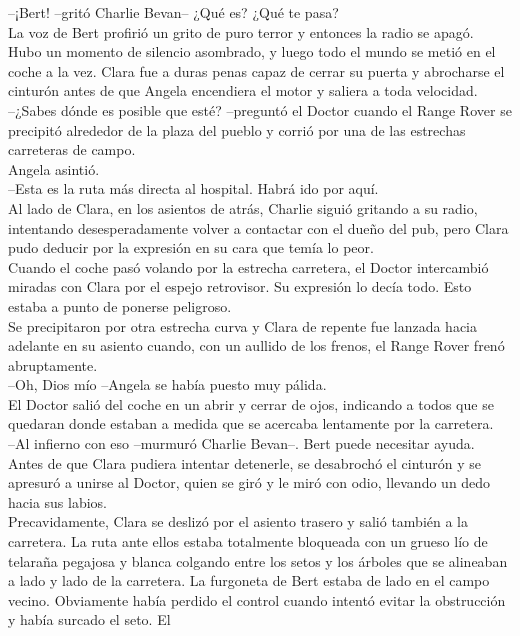 --¡Bert! --gritó Charlie Bevan-- ¿Qué es? ¿Qué te pasa?\\
La voz de Bert profirió un grito de puro terror y entonces la radio se
apagó.\\
Hubo un momento de silencio asombrado, y luego todo el mundo se metió en
el coche a la vez. Clara fue a duras penas capaz de cerrar su puerta y
abrocharse el cinturón antes de que Angela encendiera el motor y saliera
a toda velocidad.\\
--¿Sabes dónde es posible que esté? --preguntó el Doctor cuando el Range
Rover se precipitó alrededor de la plaza del pueblo y corrió por una de
las estrechas carreteras de campo.\\
Angela asintió.\\
--Esta es la ruta más directa al hospital. Habrá ido por aquí.\\
Al lado de Clara, en los asientos de atrás, Charlie siguió gritando a su
radio, intentando desesperadamente volver a contactar con el dueño del
pub, pero Clara pudo deducir por la expresión en su cara que temía lo
peor.\\
Cuando el coche pasó volando por la estrecha carretera, el Doctor
intercambió miradas con Clara por el espejo retrovisor. Su expresión lo
decía todo. Esto estaba a punto de ponerse peligroso.\\
Se precipitaron por otra estrecha curva y Clara de repente fue lanzada
hacia adelante en su asiento cuando, con un aullido de los frenos, el
Range Rover frenó abruptamente.\\
--Oh, Dios mío --Angela se había puesto muy pálida.\\
El Doctor salió del coche en un abrir y cerrar de ojos, indicando a
todos que se quedaran donde estaban a medida que se acercaba lentamente
por la carretera.\\
--Al infierno con eso --murmuró Charlie Bevan--. Bert puede necesitar
ayuda.\\
Antes de que Clara pudiera intentar detenerle, se desabrochó el cinturón
y se apresuró a unirse al Doctor, quien se giró y le miró con odio,
llevando un dedo hacia sus labios.\\
Precavidamente, Clara se deslizó por el asiento trasero y salió también
a la carretera. La ruta ante ellos estaba totalmente bloqueada con un
grueso lío de telaraña pegajosa y blanca colgando entre los setos y los
árboles que se alineaban a lado y lado de la carretera. La furgoneta de
Bert estaba de lado en el campo vecino. Obviamente había perdido el
control cuando intentó evitar la obstrucción y había surcado el seto. El
